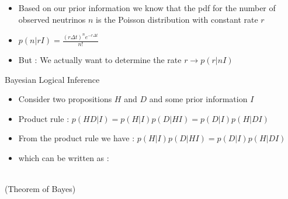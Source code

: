 \Tr
\begin{itemize}
\item Based on our prior information we know that the pdf for the number of\\
      observed neutrinos $n$ is the Poisson distribution with constant rate $r$
\item[] \begin{center} {\blue $\displaystyle p(n|rI)=\frac{(r\Delta t)^{n} e^{-r\Delta t}}{n!}$} \end{center}
\item But : We actually want to determine the rate $r \rightarrow p(r|nI)$
\end{itemize}
%
\begin{center}
{\red Bayesian Logical Inference} 
\end{center}
\begin{itemize}
\item Consider two {\red propositions $H$ and $D$} and some {\red prior information $I$}
\item[] {\red Product rule : $p(HD|I)=p(H|I)p(D|HI)=p(D|I)p(H|DI)$}
\item From the product rule we have : $p(H|I)p(D|HI)=p(D|I)p(H|DI)$
\item[] which can be written as :
\end{itemize}
%
\begin{center}
{\red {}\\[5mm]
 (Theorem of Bayes)}
\end{center}

